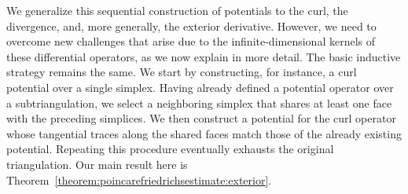 \documentclass[10pt,a4paper]{article}
\newcommand\cye[1]{%
\protect\leavevmode
\begingroup
    \color{blue}%
    #1%
\endgroup
}
\begin{document}

We generalize this sequential construction of potentials to the curl, the divergence, and, more generally, the exterior derivative.
However, we need to overcome new challenges that arise due to the infinite-dimensional kernels of these differential operators, as we now explain in more detail.
The basic inductive strategy remains the same.
We start by constructing, for instance, a curl potential over a single simplex.
Having already defined a potential operator over a subtriangulation, we select a neighboring simplex that shares at least one face with the preceding simplices.
We then construct a potential for the curl operator whose tangential traces along the shared faces match those of the already existing potential.
Repeating this procedure eventually exhausts the original triangulation.
Our main result here is Theorem~\ref{theorem:poincarefriedrichsestimate:exterior}.
\end{document}
